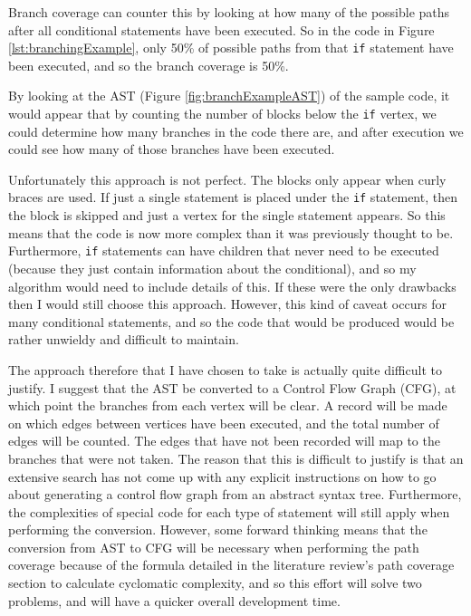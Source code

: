 Branch coverage can counter this by looking at how many of the possible paths after all conditional statements have been executed. So in the code in Figure \ref{lst:branchingExample}, only 50\% of possible paths from that \verb|if| statement have been executed, and so the branch coverage is 50\%.

By looking at the AST (Figure \ref{fig:branchExampleAST}) of the sample code, it would appear that by counting the number of blocks below the \verb|if| vertex, we could determine how many branches in the code there are, and after execution we could see how many of those branches have been executed.

Unfortunately this approach is not perfect. The blocks only appear when curly braces are used. If just a single statement is placed under the \verb|if| statement, then the block is skipped and just a vertex for the single statement appears. So this means that the code is now more complex than it was previously thought to be. Furthermore, \verb|if| statements can have children that never need to be executed (because they just contain information about the conditional), and so my algorithm would need to include details of this. If these were the only drawbacks then I would still choose this approach. However, this kind of caveat occurs for many conditional statements, and so the code that would be produced would be rather unwieldy and difficult to maintain.

The approach therefore that I have chosen to take is actually quite difficult to justify. I suggest that the AST be converted to a Control Flow Graph (CFG), at which point the branches from each vertex will be clear. A record will be made on which edges between vertices have been executed, and the total number of edges will be counted. The edges that have not been recorded will map to the branches that were not taken. The reason that this is difficult to justify is that an extensive search has not come up with any explicit instructions on how to go about generating a control flow graph from an abstract syntax tree. Furthermore, the complexities of special code for each type of statement will still apply when performing the conversion. However, some forward thinking means that the conversion from AST to CFG will be necessary when performing the path coverage because of the formula detailed in the literature review's path coverage section to calculate cyclomatic complexity, and so this effort will solve two problems, and will have a quicker overall development time.

